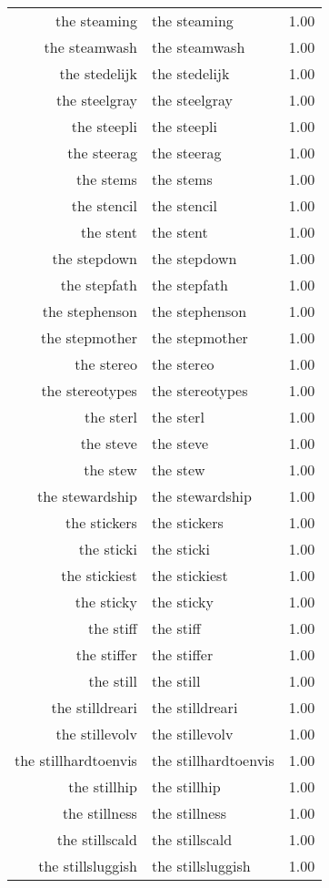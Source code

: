 \begin{table}[ht]
\begin{tabular}{rlr}
  the steaming & the steaming & 1.00 \\ 
  the steamwash & the steamwash & 1.00 \\ 
  the stedelijk & the stedelijk & 1.00 \\ 
  the steelgray & the steelgray & 1.00 \\ 
  the steepli & the steepli & 1.00 \\ 
  the steerag & the steerag & 1.00 \\ 
  the stems & the stems & 1.00 \\ 
  the stencil & the stencil & 1.00 \\ 
  the stent & the stent & 1.00 \\ 
  the stepdown & the stepdown & 1.00 \\ 
  the stepfath & the stepfath & 1.00 \\ 
  the stephenson & the stephenson & 1.00 \\ 
  the stepmother & the stepmother & 1.00 \\ 
  the stereo & the stereo & 1.00 \\ 
  the stereotypes & the stereotypes & 1.00 \\ 
  the sterl & the sterl & 1.00 \\ 
  the steve & the steve & 1.00 \\ 
  the stew & the stew & 1.00 \\ 
  the stewardship & the stewardship & 1.00 \\ 
  the stickers & the stickers & 1.00 \\ 
  the sticki & the sticki & 1.00 \\ 
  the stickiest & the stickiest & 1.00 \\ 
  the sticky & the sticky & 1.00 \\ 
  the stiff & the stiff & 1.00 \\ 
  the stiffer & the stiffer & 1.00 \\ 
  the still & the still & 1.00 \\ 
  the stilldreari & the stilldreari & 1.00 \\ 
  the stillevolv & the stillevolv & 1.00 \\ 
  the stillhardtoenvis & the stillhardtoenvis & 1.00 \\ 
  the stillhip & the stillhip & 1.00 \\ 
  the stillness & the stillness & 1.00 \\ 
  the stillscald & the stillscald & 1.00 \\ 
  the stillsluggish & the stillsluggish & 1.00 \\ 

\end{tabular}
\end{table}
